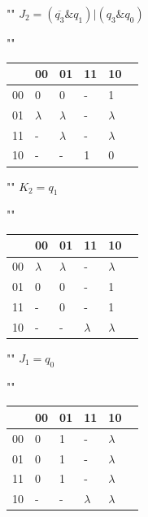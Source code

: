 \documentclass[a4paper,12pt]{article}
\begin{document}
\begin{center}
	""\newline\newline
	$J_{2} = (\overline{q_{3}} \& q_{1})| (q_{3} \& q_{0})$
	
	""\newline
	\begin{tabular}{ | l | l | l | l | l | p{1cm} |}
		\hline
		\diagbox[width=5em]{$q_{3}q_{2}$}{$q_{1}q_{0}$} & 00 & 01 & 11 & 10 \\\hline
		00 & 0 & 0 & \cellcolor{blue!25} - & \cellcolor{blue!25} 1 \\\hline
		01 & $\lambda$ & $\lambda$ & \cellcolor{blue!25} - & \cellcolor{blue!25} $\lambda$ \\ \hline
		11 & - & \cellcolor{blue!25} $\lambda$ & \cellcolor{blue!25} - &  $\lambda$  \\ \hline
		10 & - & \cellcolor{blue!25} - & \cellcolor{blue!25} 1 & 0 \\ 
		\hline
	\end{tabular}

	""\newline\newline
	$K_{2} = q_{1}$
	
	""\newline
	\begin{tabular}{ | l | l | l | l | l | p{1cm} |}
		\hline
		\diagbox[width=5em]{$q_{3}q_{2}$}{$q_{1}q_{0}$} & 00 & 01 & 11 & 10 \\\hline
		00 & $\lambda$  & $\lambda$  & \cellcolor{blue!25} - & \cellcolor{blue!25} $\lambda$  \\\hline
		01 & 0 & 0 & \cellcolor{blue!25} - & \cellcolor{blue!25} 1 \\ \hline
		11 & - &  0 & \cellcolor{blue!25} - &  \cellcolor{blue!25} 1  \\ \hline
		10 & - & - & \cellcolor{blue!25} \cellcolor{blue!25} $\lambda$  & \cellcolor{blue!25} $\lambda$  \\ 
		\hline
	\end{tabular}

	""\newline\newline
	$J_{1} = q_{0}$
	
	""\newline
	\begin{tabular}{ | l | l | l | l | l | p{1cm} |}
		\hline
		\diagbox[width=5em]{$q_{3}q_{2}$}{$q_{1}q_{0}$} & 00 & 01 & 11 & 10 \\\hline
		00 & 0  & \cellcolor{blue!25} 1  & \cellcolor{blue!25} - & $\lambda$  \\\hline
		01 & 0  & \cellcolor{blue!25} 1  & \cellcolor{blue!25} - & $\lambda$  \\\hline
		11 & 0  & \cellcolor{blue!25} 1  & \cellcolor{blue!25} - & $\lambda$  \\\hline
		10 & -  & \cellcolor{blue!25} - & \cellcolor{blue!25} $\lambda$  & $\lambda$  \\ 
		\hline
	\end{tabular}


\end{center}
\end{document}
